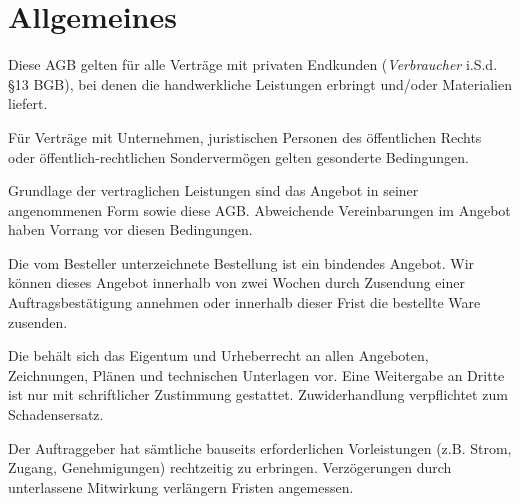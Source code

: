 \documentclass[fontsize=12pt,parskip=half]{scrartcl}
\author{}
\begin{document}

\subject{\large Allgemeine Geschäftsbedingungen - Privatkunden}
\title{\large \companyName}
\subtitle{\normalsize \companyLocation}
\date{\small \effDate}
\maketitle

\tableofcontents

\newpage

\section{Allgemeines}

\begin{contract}

\Clause[title={Geltungsbereich}]

Diese AGB gelten für alle Verträge mit privaten Endkunden (\emph{Verbraucher} i.S.d. §13 BGB), bei denen die \companyName{} handwerkliche Leistungen erbringt und/oder Materialien liefert. 

Für Verträge mit Unternehmen, juristischen Personen des öffentlichen Rechts oder öffentlich-rechtlichen Sondervermögen gelten gesonderte Bedingungen.


\Clause[title={Vertragsgrundlagen}]

Grundlage der vertraglichen Leistungen sind das Angebot in seiner angenommenen Form sowie diese AGB. Abweichende Vereinbarungen im Angebot haben Vorrang vor diesen Bedingungen.

Die vom Besteller unterzeichnete Bestellung ist ein bindendes Angebot. Wir können dieses Angebot innerhalb von zwei Wochen durch Zusendung einer Auftragsbestätigung annehmen oder innerhalb dieser Frist die bestellte Ware zusenden.

\Clause[title={Unterlagen, Eigentum und Rechte}]

Die \companyName{} behält sich das Eigentum und Urheberrecht an allen Angeboten, Zeichnungen, Plänen und technischen Unterlagen vor. Eine Weitergabe an Dritte ist nur mit schriftlicher Zustimmung gestattet. Zuwiderhandlung verpflichtet zum Schadensersatz.


\Clause[title={Mitwirkungspflichten}]

Der Auftraggeber hat sämtliche bauseits erforderlichen Vorleistungen (z.B. Strom, Zugang, Genehmigungen) rechtzeitig zu erbringen. Verzögerungen durch unterlassene Mitwirkung verlängern Fristen angemessen.

\end{contract}
\end{document}
